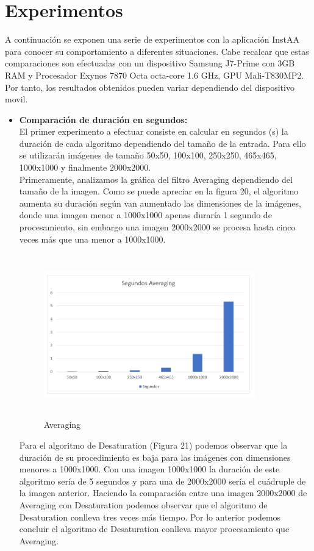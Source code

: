 \documentclass[journal]{IEEEtran}
\begin{document}
		


\newpage
\section{Experimentos}
A continuación se exponen una serie de experimentos con la aplicación InstAA para conocer su comportamiento a diferentes situaciones. Cabe recalcar que estas comparaciones son efectuadas con un dispositivo Samsung J7-Prime con 3GB RAM y Procesador Exynos 7870 Octa octa-core 1.6 GHz, GPU Mali-T830MP2. Por tanto, los resultados obtenidos pueden variar dependiendo del dispositivo movil. \\
\begin{itemize}
	\item{\bf Comparación de duración en segundos:}  \\
	El primer experimento a efectuar consiste en calcular en segundos (s) la duración de cada algoritmo dependiendo del tamaño de la entrada. Para ello se utilizarán imágenes de tamaño 50x50, 100x100, 250x250, 465x465, 1000x1000 y finalmente 2000x2000. \\
	Primeramente, analizamos la gráfica del filtro Averaging dependiendo del tamaño de la imagen. Como se puede apreciar en la figura 20, el algoritmo aumenta su duración según van aumentado las dimensiones de la imágenes, donde una imagen menor a 1000x1000 apenas duraría 1 segundo de procesamiento, sin embargo una imagen 2000x2000 se procesa hasta cinco veces más que una menor a 1000x1000. 

	\begin{figure}[h]
		\centering
		\includegraphics[height= 200pt, width=260pt]{msa.png}
		\caption{Averaging}
	\end{figure}


	Para el algoritmo de Desaturation (Figura 21) podemos observar que la duración de su procedimiento es baja para las imágenes con dimensiones menores a 1000x1000. Con una imagen 1000x1000 la duración de este algoritmo sería de 5 segundos y para una de 2000x2000 sería el cuádruple de la imagen anterior. Haciendo la comparación entre una imagen 2000x2000 de Averaging con Desaturation podemos observar que el algoritmo de Desaturation conlleva tres veces más tiempo. Por lo anterior podemos concluir el algoritmo de Desaturation conlleva mayor procesamiento que Averaging.
	

\end{itemize}
\end{document}
